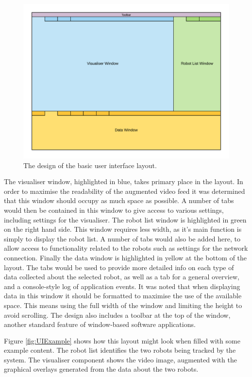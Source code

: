 \begin{figure}
	\centering
	\includegraphics[scale=1]{Figures/UILayout.png}
	\decoRule
	\caption[UI Layout]{The design of the basic user interface layout.}
	\label{fig:UILayout}
\end{figure}

The visualiser window, highlighted in blue, takes primary place in the layout. In order to maximise the readability of the augmented video feed it was determined that this window should occupy as much space as possible. A number of tabs would then be contained in this window to give access to various settings, including settings for the visualiser. The robot list window is highlighted in green on the right hand side. This window requires less width, as it's main function is simply to display the robot list. A number of tabs would also be added here, to allow access to functionality related to the robots such as settings for the network connection. Finally the data window is highlighted in yellow at the bottom of the layout. The tabs would be used to provide more detailed info on each type of data collected about the selected robot, as well as a tab for a general overview, and a console-style log of application events. It was noted that when displaying data in this window it should be formatted to maximise the use of the available space. This means using the full width of the window and limiting the height to avoid scrolling. The design also includes a toolbar at the top of the window, another standard feature of window-based software applications.

Figure \ref{fig:UIExample} shows how this layout might look when filled with some example content. The robot list identifies the two robots being tracked by the system. The visualiser component shows the video image, augmented with the graphical overlays generated from the data about the two robots.

